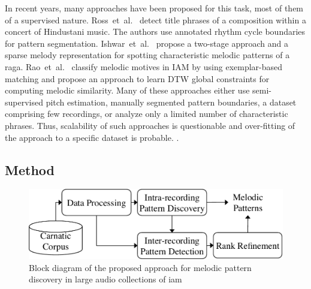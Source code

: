 In recent years, many approaches have been proposed for this task, most of them of a supervised nature.  Ross~et~al.~\cite{Ross2012b} detect title phrases of a composition within a concert of Hindustani music. The authors use annotated rhythm cycle boundaries for pattern segmentation. Ishwar~et~al.~\cite{Ishwar2013} propose a two-stage approach and a sparse melody representation for spotting characteristic melodic patterns of a \gls{raga}. Rao~et~al.~\cite{Rao2014} classify melodic motives in IAM by using exemplar-based matching and propose an approach to learn DTW global constraints for computing melodic similarity. Many of these approaches either use semi-supervised pitch estimation, manually segmented pattern boundaries, a dataset comprising few recordings, or analyze only a limited number of characteristic phrases. Thus, scalability of such approaches is questionable and over-fitting of the approach to a specific dataset is probable. .




\subsection{Method}
\label{sec:patterns_discovery_method}

\begin{figure}
	\begin{center}
		\includegraphics[width=\figSizeEightyFive]{ch06_patterns/figures/discovery/blockDiagram_Overall.pdf}
	\end{center}
	\caption{Block diagram of the proposed approach for melodic pattern discovery in large audio collections of \gls{iam}}
	\label{fig:pattern_discovery_overall_block_diagram}
\end{figure}

